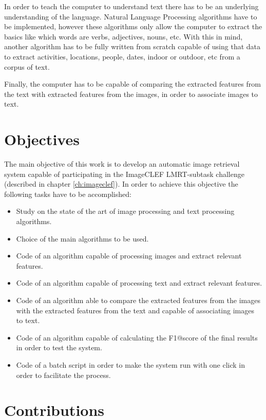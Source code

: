 In order to teach the computer to understand text there has to be an underlying understanding of the language. Natural Language Processing algorithms have to be implemented, however these algorithms only allow the computer to extract the basics like which words are verbs, adjectives, nouns, etc. With this in mind, another algorithm has to be fully written from scratch capable of using that data to extract activities, locations, people, dates, indoor or outdoor, etc from a corpus of text.

Finally, the computer has to be capable of comparing the extracted features from the text with extracted features from the images, in order to associate images to text.

\section{Objectives}

The main objective of this work is to develop an automatic image retrieval system capable of participating in the ImageCLEF LMRT-subtask challenge (described in chapter \ref{ch:imageclef}). In order to achieve this objective the following tasks have to be accomplished:

\begin{itemize}
    \item Study on the state of the art of image processing and text processing algorithms.
    \item Choice of the main algorithms to be used.
    \item Code of an algorithm capable of processing images and extract relevant features.
    \item Code of an algorithm capable of processing text and extract relevant features.
    \item Code of an algorithm able to compare the extracted features from the images with the extracted features from the text and capable of associating images to text.
    \item Code of an algorithm capable of calculating the F1@score of the final results in order to test the system.
    \item Code of a batch script in order to make the system run with one click in order to facilitate the process.
  \end{itemize}


\section{Contributions}

